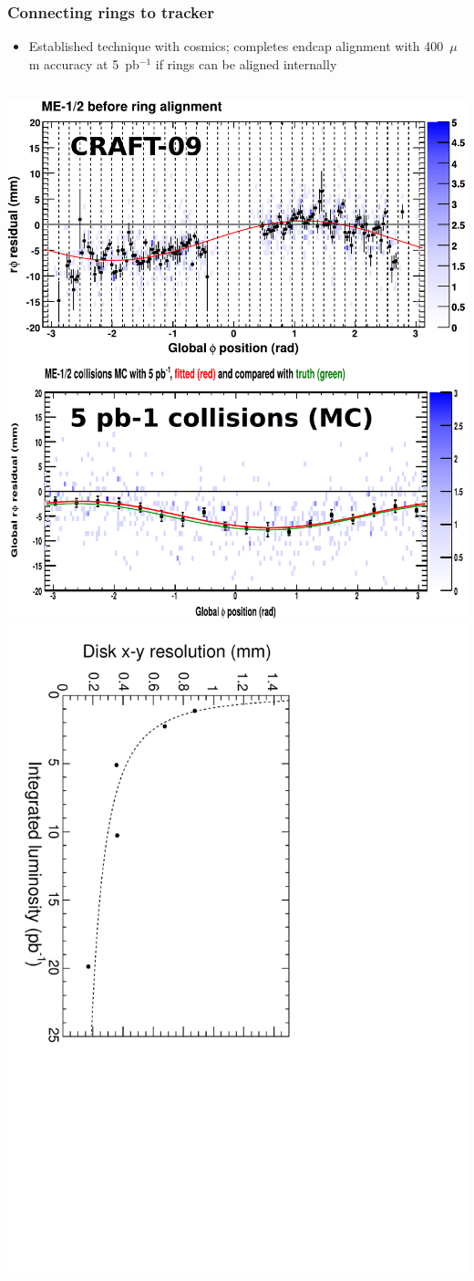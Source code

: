 \documentclass[compress]{beamer}
\begin{document}
\begin{frame}
\frametitle{Connecting rings to tracker}

\begin{itemize}
\item Established technique with cosmics; completes endcap alignment with 400~$\mu$m accuracy at 5~pb$^{-1}$ if rings can be aligned internally
\end{itemize}

\begin{columns}
\includegraphics[width=\linewidth]{all_ringfits.pdf}
\includegraphics[height=\linewidth, angle=90]{mccsc_diskstats_xy.pdf}


\end{columns}
\end{frame}
\end{document}
